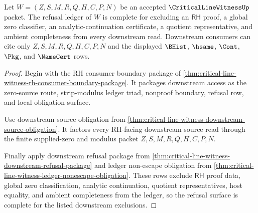 \begin{theorem}
\label{thm:critical-line-witness-rh-refusal-ledger-completeness}
Let $W=(Z,S,M,R,Q,H,C,P,N)$ be an accepted $\CriticalLineWitnessUp$ packet. The refusal ledger of $W$ is complete for excluding an $\mathsf{RH}$ proof, a global zero classifier, an analytic-continuation certificate, a quotient representative, and ambient completeness from every downstream read. Downstream consumers can cite only $Z,S,M,R,Q,H,C,P,N$ and the displayed $\BHist$, $\hsame$, $\Cont$, $\Pkg$, and $\NameCert$ rows.
\end{theorem}
\begin{proof}
Begin with the RH consumer boundary package of \autoref{thm:critical-line-witness-rh-consumer-boundary-package}. It packages downstream access as the zero-source route, strip-modulus ledger triad, nonproof boundary, refusal row, and local obligation surface.

Use downstream source obligation from \autoref{thm:critical-line-witness-downstream-source-obligation}. It factors every RH-facing downstream source read through the finite supplied-zero and modulus packet $Z,S,M,R,Q,H,C,P,N$.

Finally apply downstream refusal package from \autoref{thm:critical-line-witness-downstream-refusal-package} and ledger non-escape obligation from \autoref{thm:critical-line-witness-ledger-nonescape-obligation}. These rows exclude $\mathsf{RH}$ proof data, global zero classification, analytic continuation, quotient representatives, host equality, and ambient completeness from the ledger, so the refusal surface is complete for the listed downstream exclusions.
\end{proof}


